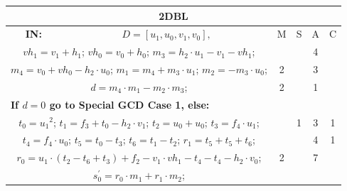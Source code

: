 \begin{tabular}{|c|cr|c|c|c|c|}
\hline
\multicolumn{7}{|c|}{\bf{2DBL}} \TS \\
\hline
\bf{IN:} &\multicolumn{2}{|c|}{$D = [u_{1},u_{0},v_{1},v_{0}], $}
\TS & M & \hspace{1pt}S\hspace{1pt} & A & \hspace{1pt}C\hspace{1pt} \\
\hline
\multicolumn{3}{|R{340pt}|}{ 
$vh_{1}=v_{1}+h_{1}$;\hspace{4pt}
$vh_{0}=v_{0}+h_{0}$;\hspace{4pt}
$m_{3}=h_{2} \cdot u_{1}-v_{1}-vh_{1}$;\hspace{4pt}
} &  &  & 4 & \\
\multicolumn{3}{|R{340pt}|}{ 
$m_{4}=v_{0}+vh_{0}-h_{2} \cdot u_{0}$;\hspace{4pt}
$m_{1}=m_{4}+m_{3} \cdot u_{1}$;\hspace{4pt}
$m_{2}=-m_{3} \cdot u_{0}$;\hspace{4pt}
} & 2 &  & 3 & \\
\multicolumn{3}{|R{340pt}|}{ 
$d=m_{4} \cdot m_{1}-m_{2} \cdot m_{3}$;\hspace{4pt}
} & 2 &  & 1 & \\
\multicolumn{3}{|l|}{ 
 \bf{If $d = 0$ go to Special GCD Case 1, else:} } &  &  &  & \\
\multicolumn{3}{|R{340pt}|}{ 
$t_{0}=u_{1}{}^{2}$;\hspace{4pt}
$t_{1}=f_{3}+t_{0}-h_{2} \cdot v_{1}$;\hspace{4pt}
$t_{2}=u_{0}+u_{0}$;\hspace{4pt}
$t_{3}=f_{4} \cdot u_{1}$;\hspace{4pt}
} &  & 1 & 3 & 1\\
\multicolumn{3}{|R{340pt}|}{ 
$t_{4}=f_{4} \cdot u_{0}$;\hspace{4pt}
$t_{5}=t_{0}-t_{3}$;\hspace{4pt}
$t_{6}=t_{1}-t_{2}$;\hspace{4pt}
$r_{1}=t_{5}+t_{5}+t_{6}$;\hspace{4pt}
} &  &  & 4 & 1\\
\multicolumn{3}{|R{340pt}|}{ 
$r_{0}=u_{1} \cdot (t_{2}-t_{6}+t_{3})+f_{2}-v_{1} \cdot vh_{1}-t_{4}-t_{4}-h_{2} \cdot v_{0}$;\hspace{4pt}
} & 2 &  & 7 & \\
\multicolumn{3}{|R{340pt}|}{ 
$s^{\prime}_{0}=r_{0} \cdot m_{1}+r_{1} \cdot m_{2}$;\hspace{4pt}
}
\end{tabular}
